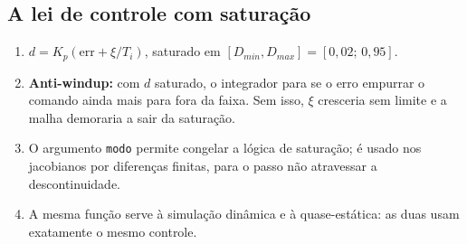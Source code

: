 \subsection{A lei de controle com satura\c{c}\~ao}


\begin{logica}
\begin{enumerate}
\item $d=K_p(\text{err}+\xi/T_i)$, saturado em $[D_{min},D_{max}]=[0{,}02;\,0{,}95]$.
\item \textbf{Anti-windup:} com $d$ saturado, o integrador para se o erro empurrar o comando ainda mais para fora da faixa.
 Sem isso, $\xi$ cresceria sem limite e a malha demoraria a sair da satura\c{c}\~ao.
\item O argumento \texttt{modo} permite congelar a l\'ogica de satura\c{c}\~ao; \'e usado nos jacobianos por diferen\c{c}as finitas, para o
 passo n\~ao atravessar a descontinuidade.
\item A mesma fun\c{c}\~ao serve \`a simula\c{c}\~ao din\^amica e \`a quase-est\'atica: as duas usam exatamente o mesmo controle.
\end{enumerate}
\end{logica}
